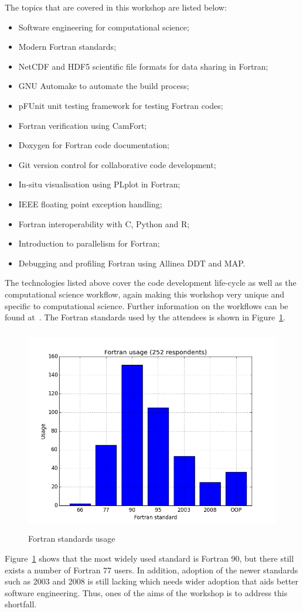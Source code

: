 \documentclass[12pt]{article}
\begin{document}
The topics that are covered in this workshop are listed below:
\begin{itemize}
\item Software engineering for computational science;
\item Modern Fortran standards;
\item NetCDF and HDF5 scientific file formats for data sharing in Fortran;
\item GNU Automake to automate the build process;
\item pFUnit unit testing framework for testing Fortran codes;
\item Fortran verification using CamFort;
\item Doxygen for Fortran code documentation;
\item Git version control for collaborative code development;
\item In-situ visualisation using PLplot in Fortran;
\item IEEE floating point exception handling;
\item Fortran interoperability with C, Python and R;
\item Introduction to parallelism for Fortran;
\item Debugging and profiling Fortran using Allinea DDT and MAP.
\end{itemize}
The technologies listed above cover the code development life-cycle as well as the computational science workflow,
again making this workshop very unique and specific to computational science. Further information on the
workflows can be found at~\cite{fmw:exp}. The Fortran standards used by the attendees is shown in Figure~\ref{fortran_usage:png}. 
\begin{figure}[H]
\begin{center}
\includegraphics[width=13cm,height=9cm]{fortran_usage.png}
\caption{Fortran standards usage}\label{fortran_usage:png}
\end{center}
\end{figure}
Figure~\ref{fortran_usage:png} shows that the most widely used standard is Fortran 90, but there still exists a number of
Fortran 77 users. In addition, adoption of the newer standards such as 2003 and 2008 is still lacking which needs wider
adoption that aids better software engineering. Thus, ones of the aims of the workshop is to address this shortfall. \\
\end{document}
